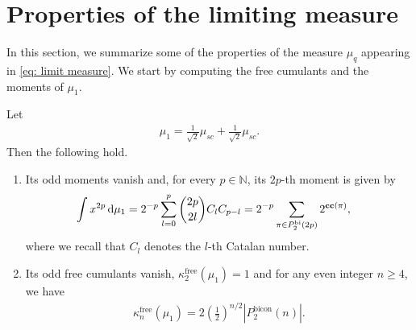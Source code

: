 \documentclass[12pt,reqno]{amsart}
\theoremstyle{plain}
\newcommand{\1}{\mathbf{1}}
\newcommand{\N}{\mathbb{N}}
\newcommand{\cumuf}{\kappa^{\operatorname{free}}}
\newcommand{\ccblocks}{\operatorname{\bf cc}}
\begin{document}

\section{Properties of the limiting measure}\label{sec: properties limit}

In this section, we summarize some of the properties of the measure $\mu_q$ appearing in \eqref{eq: limit measure}. 
We start by computing the free cumulants and the moments of $\mu_1$.
\begin{proposition}\label{proposition: cumulants and moments mu_1}
    Let
    \begin{align*}
        \mu_1=\frac{1}{\sqrt{2}}\mu_{sc}+\frac{1}{\sqrt{2}}\mu_{sc}.
    \end{align*}
    Then the following hold.
    \begin{enumerate}
        \item Its odd moments vanish and, for every $p \in \N$, its $2p$-th moment is given by
        \begin{align*}
            \int x^{2p}\, \text{d}\mu_1&=2^{-p}\sum_{l=0}^p\binom{2p}{2l}C_lC_{p-l} =2^{-p}\sum_{\pi \in P_2^{\operatorname{bi}}(2p)}2^{\ccblocks(\pi)},
        \end{align*}
        where we recall that $C_l$ denotes the $l$-th Catalan number.
        \item Its odd free cumulants vanish, $\cumuf_2(\mu_1)=1$ and for any even integer $n \ge 4$, we have
        \begin{align*}
            \cumuf_n(\mu_1)=2\left(\frac{1}{2}\right)^{n/2}|P_2^{\operatorname{bicon}}(n)|.
        \end{align*}
    \end{enumerate}
\end{proposition}
\end{document}
